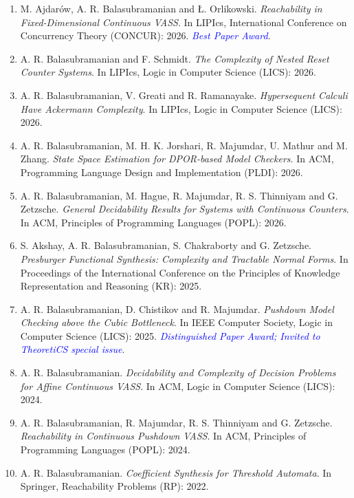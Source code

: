 \documentclass[11pt,a4paper,sans]{moderncv}        %
\begin{document}
\vspace{5pt}

\begin{enumerate}
	\setlength\itemsep{4pt}
	\item M. Ajdarów, A. R. Balasubramanian and Ł. Orlikowski. \textit{Reachability in Fixed-Dimensional Continuous VASS}. In LIPIcs, International Conference on Concurrency Theory (CONCUR): 2026.
	\textit{\textcolor{blue}{Best Paper Award}}.
	\item A. R. Balasubramanian and F. Schmidt. \textit{The Complexity of Nested Reset Counter Systems}. In LIPIcs, Logic in Computer Science (LICS): 2026.
	\item A. R. Balasubramanian, V. Greati and R. Ramanayake. \textit{Hypersequent Calculi Have Ackermann Complexity}. In LIPIcs, Logic in Computer Science (LICS): 2026.
	\item A. R. Balasubramanian, M. H. K. Jorshari, R. Majumdar, U. Mathur and M. Zhang. \textit{State Space Estimation for DPOR-based Model Checkers}. In ACM, Programming Language Design and Implementation (PLDI): 2026.
	\item A. R. Balasubramanian, M. Hague, R. Majumdar, R. S. Thinniyam and G. Zetzsche. \textit{General Decidability Results for Systems with Continuous Counters}. In ACM, Principles of Programming Languages (POPL): 2026.
	\item S. Akshay, A. R. Balasubramanian, S. Chakraborty and G. Zetzsche. \textit{Presburger Functional Synthesis: Complexity and Tractable Normal Forms}. In Proceedings of the International Conference on the Principles of Knowledge Representation and Reasoning (KR): 2025.
	\item A. R. Balasubramanian, D. Chistikov and R. Majumdar. 
	\textit{Pushdown Model Checking above the Cubic Bottleneck}.
	In IEEE Computer Society, Logic in Computer Science (LICS): 2025. \textit{\textcolor{blue}{Distinguished Paper Award; Invited to TheoretiCS special issue}}.
	\item A. R. Balasubramanian.
	\textit{Decidability and Complexity of Decision Problems for Affine Continuous VASS}.
	In ACM, Logic in Computer Science (LICS): 2024.
	\item A. R. Balasubramanian, R. Majumdar, R. S. Thinniyam and G. Zetzsche.
	\textit{Reachability in Continuous Pushdown VASS}.
	In ACM, Principles of Programming Languages (POPL): 2024.
	\item A. R. Balasubramanian.
	\textit{Coefficient Synthesis for Threshold Automata}.
	In Springer, Reachability Problems (RP): 2022. 

\end{enumerate}
\end{document}
